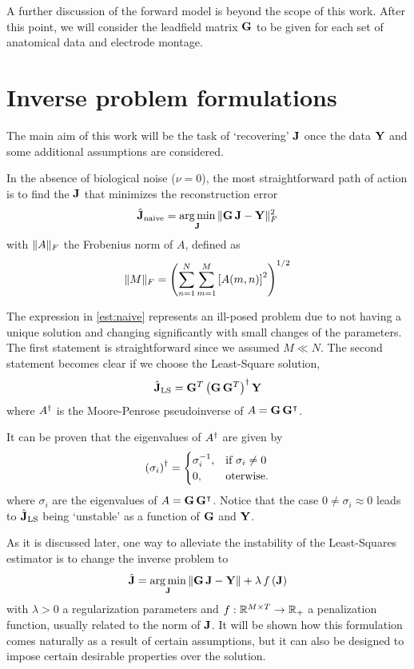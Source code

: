 A further discussion of the forward model is beyond the scope of this work.
%
After this point, we will consider the leadfield matrix $\mathbf{G}$ to be given for each set of anatomical data and electrode montage.

\section{Inverse problem formulations}

The main aim of this work will be the task of `recovering' $\mathbf{J}$ once the data $\mathbf{Y}$ and some additional assumptions are considered.

In the absence of biological noise ($\nu = 0$),
the most straightforward path of action is to find the $\mathbf{J}$ that minimizes the reconstruction error
\begin{equation}
\hat{\J}_{\text{naive}} =
\argmin_{\J}\, \nnorm{\G\, \J- \Y}_F^2 %
\label{est:naive}
\end{equation}
with $\lVert A \rVert_F$ the Frobenius norm of $A$, defined as
\begin{equation}
\lVert M \rVert_F =
\left( 
\sum_{n=1}^N \sum_{m=1}^M \left[ A(m,n) \right]^2
 \right)^{1/2}
\end{equation}

The expression in \eqref{est:naive} represents
an ill-posed problem due to not having a unique solution and changing significantly with small changes of the parameters.
%
The first statement is straightforward since we assumed $M\ll N$.
%
The second statement becomes clear if we choose the Least-Square solution,
\begin{equation}
\hat{\mathbf{J}}_{\text{LS}} =
\mathbf{G}^T \left( \mathbf{G}\, \mathbf{G}^T \right)^\dagger \mathbf{Y}
\end{equation}
where $A^\dagger$ is the Moore-Penrose pseudoinverse of $A=\mathbf{G}\, \mathbf{G}^\intercal$.

It can be proven that the eigenvalues of $A^\dagger$ are given by
\begin{equation}
\left( \sigma_i \right)^\dagger =
\begin{cases}
\sigma_i^{-1}, &\text{if } \sigma_i\neq 0 \\
0, &\text{oterwise}.
\end{cases}
\end{equation}
where $\sigma_i$ are the eigenvalues of $A=\mathbf{G}\, \mathbf{G}^\intercal$. 
%
Notice that the case $0\neq \sigma_i \approx 0$ leads to $\hat{\mathbf{J}}_{\text{LS}}$ being `unstable' as a function of $\mathbf{G}$ and $\mathbf{Y}$.

As it is discussed later, one way to alleviate the instability of the Least-Squares estimator is to change the inverse problem to
\begin{equation}
\hat{\mathbf{J}} = \operatorname*{arg\,min}_{\mathbf{J}}\, \lVert \mathbf{G}\, \mathbf{J} - \mathbf{Y} \rVert + \lambda\, f\left( \mathbf{J} \right)
\label{est:gral}
\end{equation}
with $\lambda>0$ a regularization parameters and
$f: \mathbb{R}^{M\times T} \rightarrow \mathbb{R}_+$ a penalization function, usually related to the norm of $\mathbf{J}$.
%
It will be shown how this formulation comes naturally as a result of certain assumptions, but it can also be designed to impose certain desirable properties over the solution.

